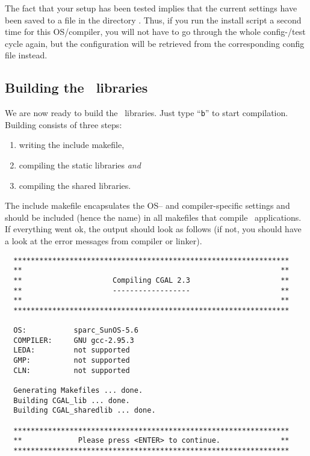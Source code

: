 The fact that your setup has been tested implies that the current
settings have been saved to a file in the directory \cgalinstconfdir.
Thus, if you run the install script a second time for this
OS/compiler, you will not have to go through the whole config-/test
cycle again, but the configuration will be retrieved from the
corresponding config file instead.

\subsection{Building the \cgal\ libraries}\label{sec:build-the-libs}

We are now ready to build the \cgal\ libraries.  Just type ``{\tt b}''
to start compilation. Building consists of three steps:
\begin{enumerate}
\item writing the include makefile,
\item compiling the static libraries \textit{and}
\item compiling the shared libraries.
\end{enumerate}
The include makefile encapsulates the OS-- and
compiler-specific settings and should be included (hence the name) in
all makefiles that compile \cgal\ applications. If everything went ok,
the output should look as follows (if not, you should have a look at
the error messages from compiler or linker).

{\ccTexHtml{\scriptsize}{}
\begin{verbatim}
  ****************************************************************
  **                                                            **
  **                     Compiling CGAL 2.3                     **
  **                     ------------------                     **
  **                                                            **
  ****************************************************************

  OS:           sparc_SunOS-5.6
  COMPILER:     GNU gcc-2.95.3
  LEDA:         not supported
  GMP:          not supported
  CLN:          not supported

  Generating Makefiles ... done.
  Building CGAL_lib ... done.
  Building CGAL_sharedlib ... done.

  ****************************************************************
  **             Please press <ENTER> to continue.              **
  ****************************************************************
\end{verbatim}}
{
}  

